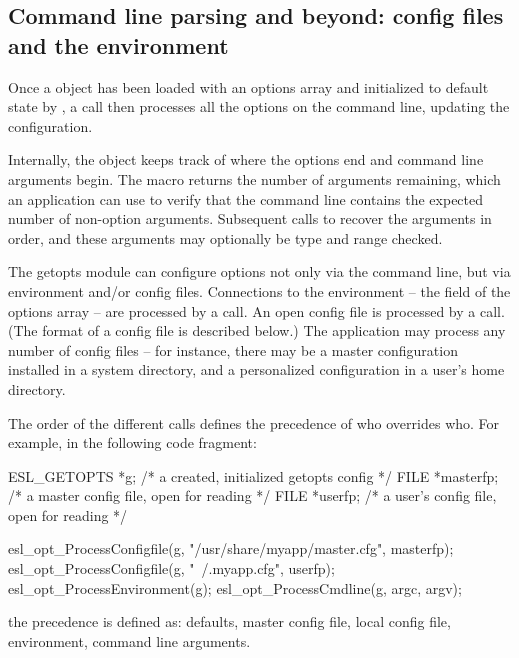 \subsection{Command line parsing and beyond: config files and the environment}

Once a  object has been loaded with an options
array and initialized to default state by
, a 
call then processes all the options on the command line, updating the
configuration. 

Internally, the object keeps track of where the options end and
command line arguments begin. The macro 
returns the number of arguments remaining, which an application can
use to verify that the command line contains the expected number of
non-option arguments.  Subsequent calls to
 recover the arguments in order, and
these arguments may optionally be type and range checked.

The getopts module can configure options not only via the command
line, but via environment and/or config files.  Connections to the
environment -- the  field of the options array -- are
processed by a  call.  An open
config file is processed by a 
call. (The format of a config file is described below.) The
application may process any number of config files -- for instance,
there may be a master configuration installed in a system directory,
and a personalized configuration in a user's home directory.

The order of the different  calls defines the
precedence of who overrides who. For example, in the following code
fragment:

\begin{cchunk}
   ESL_GETOPTS *g;        /* a created, initialized getopts config  */
   FILE *masterfp;        /* a master config file, open for reading */
   FILE *userfp;          /* a user's config file, open for reading */

   esl_opt_ProcessConfigfile(g, "/usr/share/myapp/master.cfg", masterfp);
   esl_opt_ProcessConfigfile(g, "~/.myapp.cfg",                userfp);
   esl_opt_ProcessEnvironment(g);
   esl_opt_ProcessCmdline(g, argc, argv);
\end{cchunk}

the precedence is defined as: defaults, master config file, local
config file, environment, command line arguments. 


